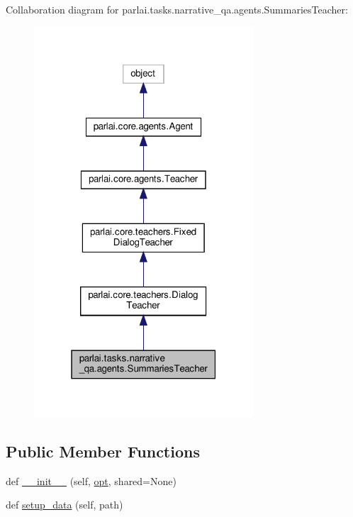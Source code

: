 Collaboration diagram for parlai.\+tasks.\+narrative\+\_\+qa.\+agents.\+Summaries\+Teacher\+:\nopagebreak
\begin{figure}[H]
\begin{center}
\leavevmode
\includegraphics[width=232pt]{dd/dd2/classparlai_1_1tasks_1_1narrative__qa_1_1agents_1_1SummariesTeacher__coll__graph}
\end{center}
\end{figure}
\subsection*{Public Member Functions}
\begin{DoxyCompactItemize}
\item 
def \hyperlink{classparlai_1_1tasks_1_1narrative__qa_1_1agents_1_1SummariesTeacher_a833c2c54f6084e88dbe0a16151fc4a46}{\+\_\+\+\_\+init\+\_\+\+\_\+} (self, \hyperlink{classparlai_1_1core_1_1agents_1_1Teacher_a3ce6243860ce978a897922863ed32fa4}{opt}, shared=None)
\item 
def \hyperlink{classparlai_1_1tasks_1_1narrative__qa_1_1agents_1_1SummariesTeacher_a76f9cadca71b61d42c5997ba590f107e}{setup\+\_\+data} (self, path)
\end{DoxyCompactItemize}
